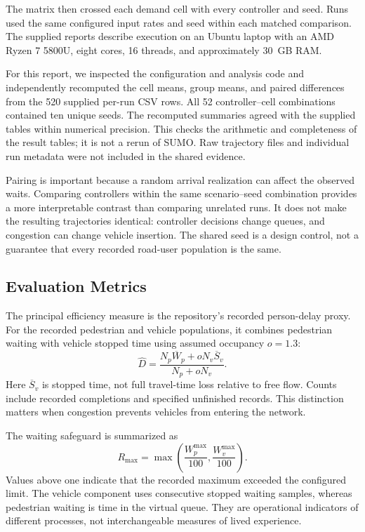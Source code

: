 \documentclass[sigconf]{acmart}
\newcommand{\mw}{R_{\max}}
\begin{document}
The matrix then crossed each demand cell with every controller and
seed. Runs used the same configured input rates and seed within
each matched comparison. The supplied reports describe execution
on an Ubuntu laptop with an AMD Ryzen 7 5800U, eight cores,
16 threads, and approximately 30~GB RAM.

For this report, we inspected the configuration and analysis code
and independently recomputed the cell means, group means, and
paired differences from the 520 supplied per-run CSV rows.
All 52 controller--cell combinations contained ten unique seeds.
The recomputed summaries agreed with the supplied tables within
numerical precision. This checks the arithmetic and completeness
of the result tables; it is not a rerun of SUMO. Raw trajectory
files and individual run metadata were not included in the shared
evidence.

Pairing is important because a random arrival realization can affect
the observed waits. Comparing controllers within the same
scenario--seed combination provides a more interpretable contrast
than comparing unrelated runs. It does not make the resulting
trajectories identical: controller decisions change queues, and
congestion can change vehicle insertion. The shared seed is a
design control, not a guarantee that every recorded road-user
population is the same.

\subsection{Evaluation Metrics}
The principal efficiency measure is the repository's recorded
person-delay proxy. For the recorded pedestrian and vehicle
populations, it combines pedestrian waiting with vehicle stopped
time using assumed occupancy $o=1.3$:
\begin{equation}
\widehat D=
\frac{N_p\overline W_p+oN_v\overline S_v}
     {N_p+oN_v}.
\label{eq:delay}
\end{equation}
Here $\overline S_v$ is stopped time, not full travel-time loss
relative to free flow. Counts include recorded completions and
specified unfinished records. This distinction matters when
congestion prevents vehicles from entering the network.

The waiting safeguard is summarized as
\begin{equation}
\mw=\max\!\left(\frac{W_p^{\max}}{100},
                 \frac{W_v^{\max}}{100}\right).
\end{equation}
Values above one indicate that the recorded maximum exceeded
the configured limit. The vehicle component uses consecutive
stopped waiting samples, whereas pedestrian waiting is time in
the virtual queue. They are operational indicators of different
processes, not interchangeable measures of lived experience.
\end{document}
